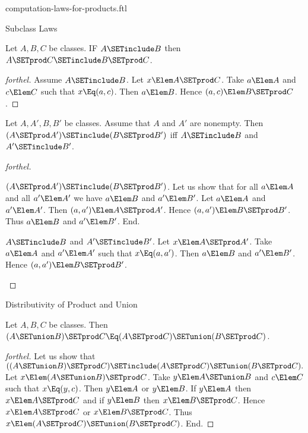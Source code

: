 \documentclass{stex}
\begin{document}
\begin{smodule}{computation-laws-for-products.ftl}

\begin{sfragment}{Subclass Laws}
  \begin{proposition}[forthel,id=FOUNDATIONS_05_5719644021194752]
    Let $A, B, C$ be classes.
    IF $A \SETinclude B$ then $A \SETprod C \SETinclude B \SETprod C$.
  \end{proposition}
  \begin{proof}[forthel]
    Assume $A \SETinclude B$.
    Let $x \Elem A \SETprod C$.
    Take $a \Elem A$ and $c \Elem C$ such that $x \Eq (a, c)$.
    Then $a \Elem B$.
    Hence $(a, c) \Elem B \SETprod C$.
  \end{proof}

  \begin{proposition}[forthel,id=FOUNDATIONS_05_4888282951319552]
    Let $A, A', B, B'$ be classes.
    Assume that $A$ and $A'$ are nonempty.
    Then $(A \SETprod A') \SETinclude (B \SETprod B')$ iff $A \SETinclude B$ and $A' \SETinclude B'$.
  \end{proposition}
  \begin{proof}[forthel]
    \begin{case}{$(A \SETprod A') \SETinclude (B \SETprod B')$.}
      Let us show that for all $a \Elem A$ and all $a' \Elem A'$ we have $a \Elem B$ and $a' \Elem B'$.
        Let $a \Elem A$ and $a' \Elem A'$.
        Then $(a, a') \Elem A \SETprod A'$.
        Hence $(a, a') \Elem B \SETprod B'$.
        Thus $a \Elem B$ and $a' \Elem B'$.
      End.
    \end{case}

    \begin{case}{$A \SETinclude B$ and $A' \SETinclude B'$.}
      Let $x \Elem A \SETprod A'$.
      Take $a \Elem A$ and $a' \Elem A'$ such that $x \Eq (a, a')$.
      Then $a \Elem B$ and $a' \Elem B'$.
      Hence $(a, a') \Elem B \SETprod B'$.
    \end{case}
  \end{proof}
\end{sfragment}

\begin{sfragment}{Distributivity of Product and Union}
  \begin{proposition}[forthel,id=FOUNDATIONS_05_8849658323402752]
    Let $A, B, C$ be classes.
    Then $(A \SETunion B) \SETprod C \Eq (A \SETprod C) \SETunion (B \SETprod C)$.
  \end{proposition}
  \begin{proof}[forthel]
    Let us show that $((A \SETunion B) \SETprod C) \SETinclude (A \SETprod C) \SETunion (B \SETprod C).$ %
      Let $x \Elem (A \SETunion B) \SETprod C$.
      Take $y \Elem A \SETunion B$ and $c \Elem C$ such that $x \Eq (y, c)$.
      Then $y \Elem A$ or $y \Elem B$.
      If $y \Elem A$ then $x \Elem A \SETprod C$ and if $y \Elem B$ then $x \Elem B \SETprod C$.
      Hence $x \Elem A \SETprod C$ or $x \Elem B \SETprod C$.
      Thus $x \Elem (A \SETprod C) \SETunion (B \SETprod C)$.
    End.


\end{proof}
\end{sfragment}
\end{smodule}
\end{document}
